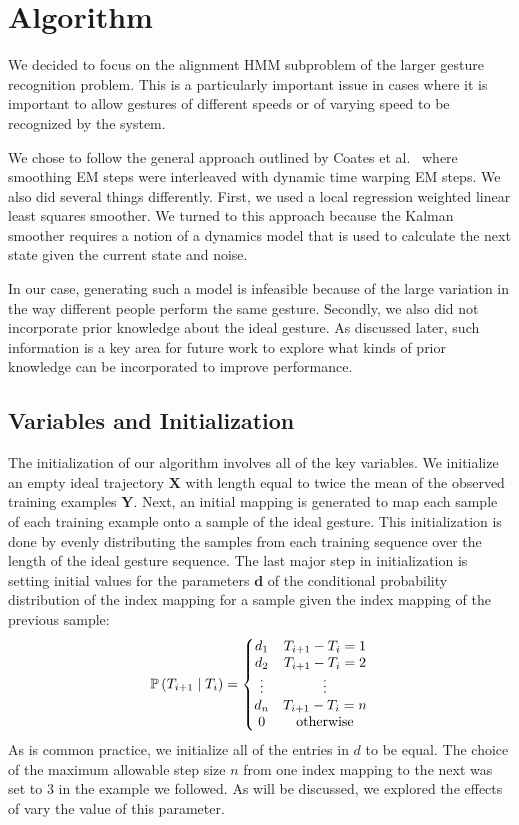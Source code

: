 \documentclass{article}
\begin{document}
\section{Algorithm}

We decided to focus on the alignment HMM subproblem of the larger gesture
recognition problem. This is a particularly important issue in cases where it is
important to allow gestures of different speeds or of varying speed to be
recognized by the system.

We chose to follow the general approach outlined by Coates et al.\
\cite{Coates2008} where smoothing EM steps were interleaved with dynamic time
warping EM steps. We also did several things differently. First, we used a local
regression weighted linear least squares smoother. We turned to this approach
because the Kalman smoother requires a notion of a dynamics model that is used
to calculate the next state given the current state and noise.

In our case, generating such a model is infeasible because of the large
variation in the way different people perform the same gesture. Secondly, we
also did not incorporate prior knowledge about the ideal gesture. As discussed
later, such information is a key area for future work to explore what kinds of
prior knowledge can be incorporated to improve performance.

\subsection{Variables and Initialization}

The initialization of our algorithm involves all of the key variables. We initialize
an empty ideal trajectory $\mathbf{X}$ with length equal to twice the mean of
the observed training examples $\mathbf{Y}$. Next, an initial mapping is generated to
map each sample of each training example onto a sample of the ideal gesture.
This initialization is done by evenly distributing the samples from each training
sequence over the length of the ideal gesture sequence. The last major step in
initialization is setting initial values for the parameters $\mathbf{d}$ of the conditional
probability distribution of the index mapping for a sample given the index
mapping of the previous sample:
\begin{equation}
\mathbb{P}\left(T_{i+1} \mid T_{i}\right) = \left\{\begin{matrix}
d_{1} & T_{i+1} - T_{i} = 1\\ 
d_{2} & T_{i+1} - T_{i} = 2\\ 
\vdots & \vdots \\ 
d_{n} & T_{i+1} - T_{i} = n\\ 
0 & \textup{otherwise}
\end{matrix}\right.
\label{tau_dist}
\end{equation}
As is common practice, we initialize all of the entries in $d$ to be equal. The
choice of the maximum allowable step size $n$ from one index mapping to the
next was set to $3$ in the example we followed. As will be discussed, we explored
the effects of vary the value of this parameter.
\end{document}

